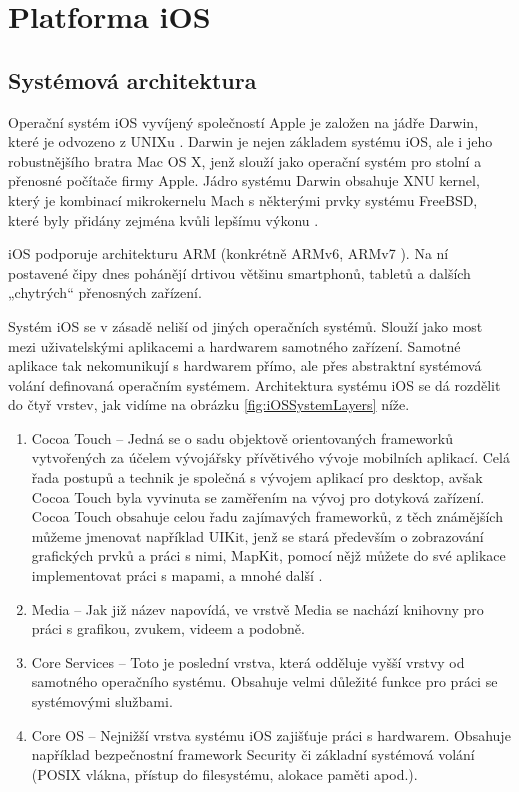 \section{Platforma iOS}
\subsection{Systémová architektura}
Operační systém iOS vyvíjený společností Apple je založen na jádře Darwin, které je odvozeno z UNIXu \cite{kernel_ios}. Darwin je nejen základem systému iOS, ale i jeho robustnějšího bratra Mac OS X, jenž slouží jako operační systém pro stolní a přenosné počítače firmy Apple. Jádro systému Darwin obsahuje XNU kernel, který je kombinací mikrokernelu Mach s některými prvky systému FreeBSD, které byly přidány zejména kvůli lepšímu výkonu \cite{what_is_darwin}.

iOS podporuje architekturu ARM (konkrétně ARMv6, ARMv7 \cite{bp_dominik}). Na ní postavené čipy dnes pohánějí drtivou většinu smartphonů, tabletů a dalších „chytrých“ přenosných zařízení.

Systém iOS se v zásadě neliší od jiných operačních systémů. Slouží jako most mezi uživatelskými aplikacemi a hardwarem samotného zařízení. Samotné aplikace tak nekomunikují s hardwarem přímo, ale přes abstraktní systémová volání definovaná operačním systémem. Architektura systému iOS se dá rozdělit do čtyř vrstev, jak vidíme na obrázku \ref{fig:iOSSystemLayers} níže. 

\begin{enumerate}
	\item Cocoa Touch – Jedná se o sadu objektově orientovaných frameworků vytvořených za účelem vývojářsky přívětivého vývoje mobilních aplikací. Celá řada postupů a technik je společná s vývojem aplikací pro desktop, avšak Cocoa Touch byla vyvinuta se zaměřením na vývoj pro dotyková zařízení. Cocoa Touch obsahuje celou řadu zajímavých frameworků, z těch známějších můžeme jmenovat například UIKit, jenž se stará především o zobrazování grafických prvků a práci s nimi, MapKit, pomocí nějž můžete do své aplikace implementovat práci s mapami, a mnohé další \cite{bp_dominik}.
	\item Media – Jak již název napovídá, ve vrstvě Media se nachází knihovny pro práci s grafikou, zvukem, videem a podobně.
	\item Core Services – Toto je poslední vrstva, která odděluje vyšší vrstvy od samotného operačního systému. Obsahuje velmi důležité funkce pro práci se systémovými službami.
	\item Core OS – Nejnižší vrstva systému iOS zajišťuje práci s hardwarem. Obsahuje například bezpečnostní framework Security či základní systémová volání (POSIX vlákna, přístup do filesystému, alokace paměti apod.).
\end{enumerate}

